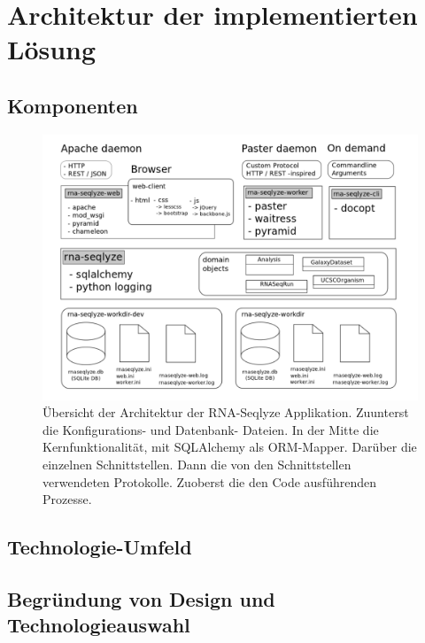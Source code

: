 \documentclass[a4paper]{thesis}
\begin{document}
\section{Architektur der implementierten Lösung}

\subsection{Komponenten}



\begin{figure}[h]
\includegraphics{img/overview_architektur}
\caption[Applikationsarchitektur]{
	Übersicht der Architektur der RNA-Seqlyze Applikation.
	Zuunterst die Konfigurations- und Datenbank- Dateien.
	In der Mitte die Kernfunktionalität, mit SQLAlchemy
	als ORM-Mapper. Darüber die einzelnen Schnittstellen.
	Dann die von den Schnittstellen verwendeten Protokolle.
	Zuoberst die den Code ausführenden Prozesse.
}
\label{fig:arch}
\end{figure}

\subsection{Technologie-Umfeld}

\subsection{Begründung von Design und Technologieauswahl}
\end{document}
